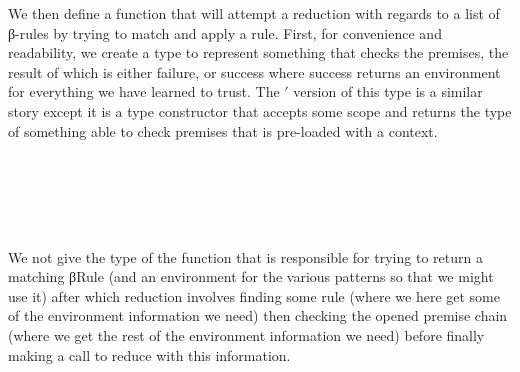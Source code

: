 We then define a function that will attempt a reduction with regards
to a list of β-rules by trying to match and apply a rule. First, for
convenience and readability, we create a type to represent something
that checks the premises, the result of which is either failure, or
success where success returns an environment for everything we have
learned to trust. The $'$ version of this type is a similar story
except it is a type constructor that accepts some scope and returns
the type of something able to check premises that is pre-loaded with
a context.
\begin{code}%
\>[0]\AgdaSpace{}%
\AgdaSymbol{=}%
\>[16]\AgdaSymbol{(}\AgdaSpace{}%
\AgdaSymbol{:}\AgdaSpace{}%
\AgdaSymbol{)}\AgdaSpace{}%
\AgdaSpace{}%
\AgdaSpace{}%
%
\>[41]\<%
\\
%
\>[16]\AgdaSymbol{\{}\AgdaSpace{}%
\AgdaSpace{}%
\AgdaSpace{}%
\AgdaSymbol{:}\AgdaSpace{}%
\AgdaSpace{}%
\AgdaSymbol{\}}%
\>[41]\<%
\\
%
\>[16]\AgdaSpace{}%
\AgdaSpace{}%
\AgdaSpace{}%
\AgdaSpace{}%
%
\>[41]\<%
\\
%
\>[16]\AgdaSpace{}%
\AgdaSpace{}%
\AgdaSpace{}%
%
\>[41]\<%
\\
%
\>[16]\AgdaSpace{}%
\AgdaSymbol{(}\AgdaSpace{}%
\AgdaSymbol{)}\<%
\end{code}
We not give the type of the function that is responsible for trying to
return a matching βRule (and an environment for the various patterns so
that we might use it) after which reduction involves finding some rule (where
we here get some of the environment information we need) then checking the
opened premise chain (where we get the rest of the environment information
we need) before finally making a call to reduce with this information.
